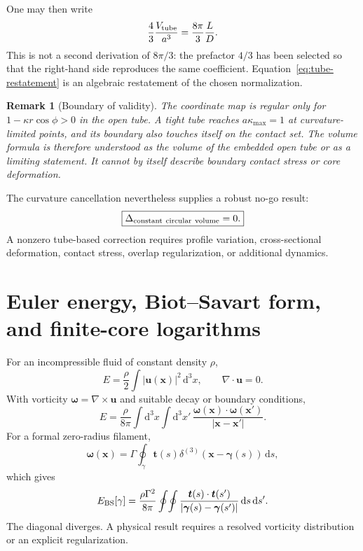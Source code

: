 \documentclass[aps,pre,preprint,notitlepage,nofootinbib,superscriptaddress]{revtex4-2}
\newcommand{\dd}{\mathrm d}
\newtheorem{remark}{Remark}
\begin{document}
One may then write
\begin{equation}
  \frac{4}{3}\frac{V_{\rm tube}}{a^3}
  =\frac{8\pi}{3}\frac{L}{D}.
  \label{eq:tube-restatement}
\end{equation}
This is not a second derivation of $8\pi/3$: the prefactor $4/3$ has been selected so that the right-hand side reproduces the same coefficient.  Equation~\eqref{eq:tube-restatement} is an algebraic restatement of the chosen normalization.

\begin{remark}[Boundary of validity]
The coordinate map is regular only for $1-\kappa r\cos\phi>0$ in the open tube.  A tight tube reaches $a\kappa_{\max}=1$ at curvature-limited points, and its boundary also touches itself on the contact set.  The volume formula is therefore understood as the volume of the embedded open tube or as a limiting statement.  It cannot by itself describe boundary contact stress or core deformation.
\end{remark}

The curvature cancellation nevertheless supplies a robust no-go result:
\begin{equation}
  \boxed{\Delta_{\rm constant\ circular\ volume}=0.}
\end{equation}
A nonzero tube-based correction requires profile variation, cross-sectional deformation, contact stress, overlap regularization, or additional dynamics.

\section{Euler energy, Biot--Savart form, and finite-core logarithms}
\label{sec:euler-energy}

For an incompressible fluid of constant density $\rho$,
\begin{equation}
  E=\frac{\rho}{2}\int |\bm u(\bm x)|^2\,\dd^3x,
  \qquad \nabla\cdot\bm u=0.
\end{equation}
With vorticity $\bm\omega=\nabla\times\bm u$ and suitable decay or boundary conditions,
\begin{equation}
  \boxed{
  E=\frac{\rho}{8\pi}
  \int\!\dd^3x\int\!\dd^3x'\,
  \frac{\bm\omega(\bm x)\cdot\bm\omega(\bm x')}
       {|\bm x-\bm x'|}.}
  \label{eq:vorticity-energy-v020}
\end{equation}
For a formal zero-radius filament,
\begin{equation}
  \bm\omega(\bm x)=\Gamma\oint_\gamma
  \bm t(s)\delta^{(3)}(\bm x-\bm\gamma(s))\,\dd s,
\end{equation}
which gives
\begin{equation}
  E_{\rm BS}[\gamma]
  =\frac{\rho\Gamma^2}{8\pi}
  \oint\!\oint
  \frac{\bm t(s)\cdot\bm t(s')}
       {|\bm\gamma(s)-\bm\gamma(s')|}\,\dd s\,\dd s'.
  \label{eq:filament-energy-v020}
\end{equation}
The diagonal diverges.  A physical result requires a resolved vorticity distribution or an explicit regularization.
\end{document}
